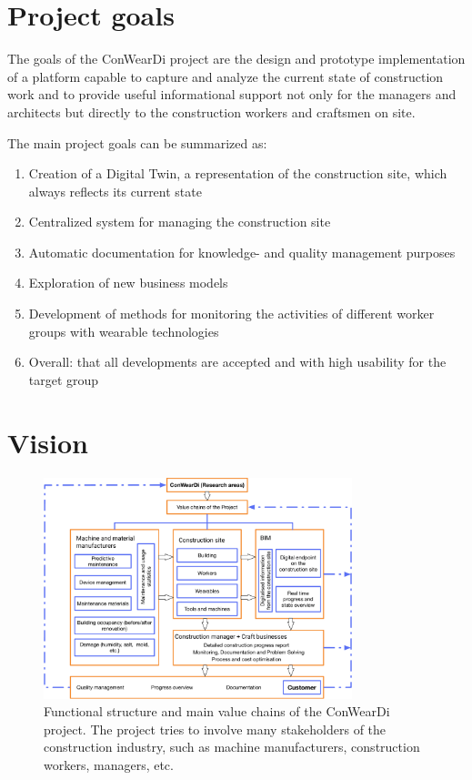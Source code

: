 \section{Project goals}
The goals of the ConWearDi project are the design and prototype implementation of a platform capable to capture and analyze the current state of construction work and to provide useful informational support not only for the managers and architects but directly to the construction workers and craftsmen on site. 


The main project goals can be summarized as:
\begin{enumerate}
  \item Creation of a Digital Twin, a representation of the construction site, which always reflects its current state 
  \item Centralized system for managing the construction site
  \item Automatic documentation for knowledge- and quality management purposes
  \item Exploration of new business models
  \item Development of methods for monitoring the activities of different worker groups with wearable technologies
  \item Overall: that all developments are accepted and with high usability for the target group
\end{enumerate}

\section{Vision}

\begin{figure}[htp]
\includegraphics[width=0.8\textwidth]{figures/conweardi-functional.pdf}
\caption{Functional structure and main value chains of the ConWearDi project. The project tries to involve many stakeholders of the construction industry, such as machine manufacturers, construction workers, managers, etc. }
\label{fig:functional}
\end{figure}

